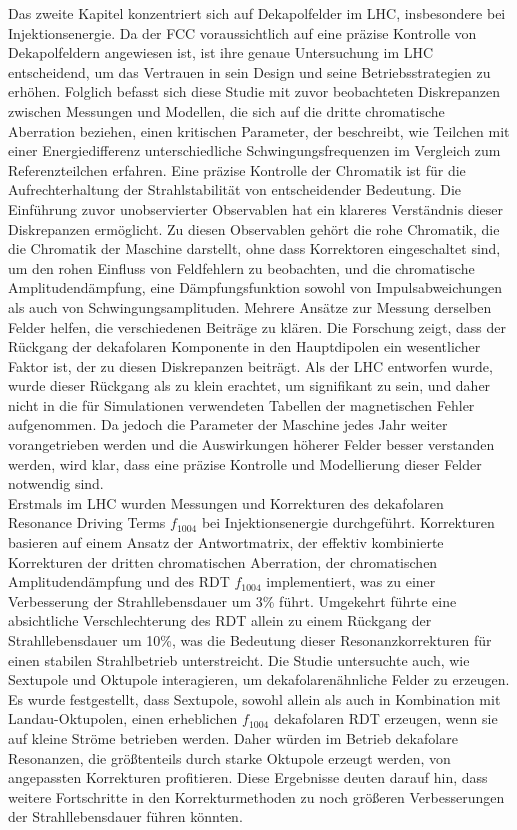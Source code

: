 {%
Das zweite Kapitel konzentriert sich auf Dekapolfelder im LHC, insbesondere bei Injektionsenergie. Da der FCC voraussichtlich auf eine präzise Kontrolle von Dekapolfeldern angewiesen ist, ist ihre genaue Untersuchung im LHC entscheidend, um das Vertrauen in sein Design und seine Betriebsstrategien zu erhöhen. Folglich befasst sich diese Studie mit zuvor beobachteten Diskrepanzen zwischen Messungen und Modellen, die sich auf die dritte chromatische Aberration beziehen, einen kritischen Parameter, der beschreibt, wie Teilchen mit einer Energiedifferenz unterschiedliche Schwingungsfrequenzen im Vergleich zum Referenzteilchen erfahren. Eine präzise Kontrolle der Chromatik ist für die Aufrechterhaltung der Strahlstabilität von entscheidender Bedeutung. Die Einführung zuvor unobservierter Observablen hat ein klareres Verständnis dieser Diskrepanzen ermöglicht. Zu diesen Observablen gehört die rohe Chromatik, die die Chromatik der Maschine darstellt, ohne dass Korrektoren eingeschaltet sind, um den rohen Einfluss von Feldfehlern zu beobachten, und die chromatische Amplitudendämpfung, eine Dämpfungsfunktion sowohl von Impulsabweichungen als auch von Schwingungsamplituden. Mehrere Ansätze zur Messung derselben Felder helfen, die verschiedenen Beiträge zu klären. Die Forschung zeigt, dass der Rückgang der dekafolaren Komponente in den Hauptdipolen ein wesentlicher Faktor ist, der zu diesen Diskrepanzen beiträgt. Als der LHC entworfen wurde, wurde dieser Rückgang als zu klein erachtet, um signifikant zu sein, und daher nicht in die für Simulationen verwendeten Tabellen der magnetischen Fehler aufgenommen. Da jedoch die Parameter der Maschine jedes Jahr weiter vorangetrieben werden und die Auswirkungen höherer Felder besser verstanden werden, wird klar, dass eine präzise Kontrolle und Modellierung dieser Felder notwendig sind.
\\
\indent
Erstmals im LHC wurden Messungen und Korrekturen des dekafolaren Resonance Driving Terms $f_{1004}$ bei Injektionsenergie durchgeführt. Korrekturen basieren auf einem Ansatz der Antwortmatrix, der effektiv kombinierte Korrekturen der dritten chromatischen Aberration, der chromatischen Amplitudendämpfung und des RDT $f_{1004}$ implementiert, was zu einer Verbesserung der Strahllebensdauer um 3\% führt. Umgekehrt führte eine absichtliche Verschlechterung des RDT allein zu einem Rückgang der Strahllebensdauer um 10\%, was die Bedeutung dieser Resonanzkorrekturen für einen stabilen Strahlbetrieb unterstreicht. Die Studie untersuchte auch, wie Sextupole und Oktupole interagieren, um dekafolarenähnliche Felder zu erzeugen. Es wurde festgestellt, dass Sextupole, sowohl allein als auch in Kombination mit Landau-Oktupolen, einen erheblichen $f_{1004}$ dekafolaren RDT erzeugen, wenn sie auf kleine Ströme betrieben werden. Daher würden im Betrieb dekafolare Resonanzen, die größtenteils durch starke Oktupole erzeugt werden, von angepassten Korrekturen profitieren. Diese Ergebnisse deuten darauf hin, dass weitere Fortschritte in den Korrekturmethoden zu noch größeren Verbesserungen der Strahllebensdauer führen könnten.

}
